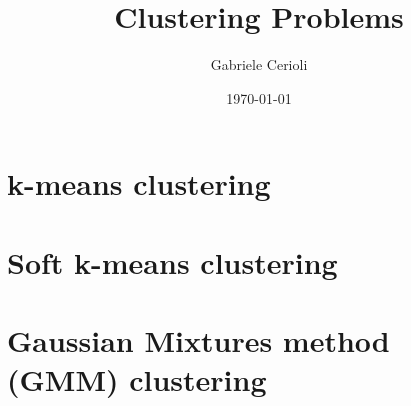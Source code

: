 \documentclass[12pt,a4paper]{article}
\title{Clustering Problems}
\author{Gabriele Cerioli}
\date{\today}
\begin{document}
\maketitle


\section{k-means clustering}

\section{Soft k-means clustering}

\section{Gaussian Mixtures method (GMM) clustering}
\end{document}
